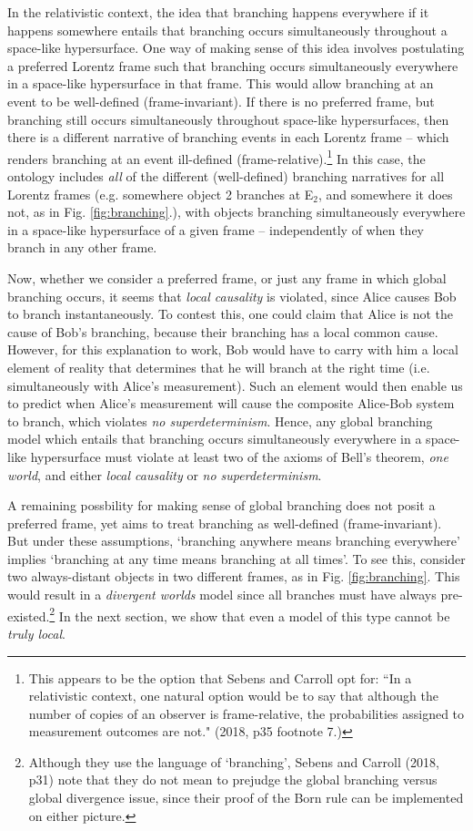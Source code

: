 \documentclass[12pt]{article}
\begin{document}
In the relativistic context, the idea that branching happens everywhere if it happens somewhere entails that branching occurs simultaneously throughout a space-like hypersurface. One way of making sense of this idea involves postulating a preferred Lorentz frame such that branching occurs simultaneously everywhere in a space-like hypersurface in that frame. This would allow branching at an event to be well-defined (frame-invariant).  If there is no preferred frame, but branching still occurs simultaneously throughout space-like hypersurfaces, then there is a different narrative of branching events in each Lorentz frame -- which renders branching at an event ill-defined (frame-relative).\footnote{This appears to be the option that Sebens and Carroll opt for: ``In a relativistic context, one natural option would be to say that although the number of copies of an observer is frame-relative, the probabilities assigned to measurement outcomes are not." (2018, p35 footnote 7.)} In this case, the ontology includes \textit{all} of the different (well-defined) branching narratives for all Lorentz frames (e.g. somewhere object 2 branches at E$_2$, and somewhere it does not, as in Fig. \ref{fig:branching}.), with objects branching simultaneously everywhere in a space-like hypersurface of a given frame -- independently of when they branch in any other frame.

Now, whether we consider a preferred frame, or just any frame in which global branching occurs, it seems that \textit{local causality} is violated, since Alice causes Bob to branch instantaneously. To contest this, one could claim that Alice is not the cause of Bob's branching, because their branching has a local common cause. However, for this explanation to work, Bob would have to carry with him a local element of reality that determines that he will branch at the right time (i.e. simultaneously with Alice's measurement). Such an element would then enable us to predict when Alice's measurement will cause the composite Alice-Bob system to branch, which violates \textit{no superdeterminism}.  Hence, any global branching model which entails that branching occurs simultaneously everywhere in a space-like hypersurface must violate at least two of the axioms of Bell's theorem, \textit{one world}, and either \textit{local causality} or \textit{no superdeterminism}.

 
A remaining possbility for making sense of global branching does not posit a preferred frame, yet aims to treat branching as well-defined (frame-invariant). But under these assumptions, `branching anywhere means branching everywhere'  implies `branching at any time means branching at all times'. To see this, consider two always-distant objects in two different frames, as in Fig. \ref{fig:branching}. This would result in a \textit{divergent worlds} model since all branches must have always pre-existed.\footnote{Although they use the language of `branching', Sebens and Carroll (2018, p31) note that they do not mean to prejudge the global branching versus global divergence issue, since their proof of the Born rule can be implemented on either picture.} In the next section, we show that even a model of this type cannot be \textit{truly local}.
\end{document}
